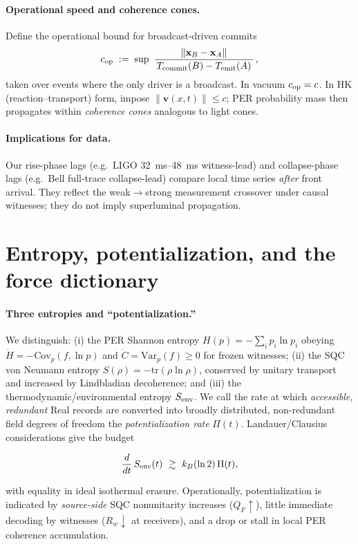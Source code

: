 \documentclass[11pt]{article}
\begin{document}
\paragraph{Operational speed and coherence cones.}
Define the operational bound for broadcast-driven commits
\begin{equation}
c_{\rm op}\;:=\;\sup\ \frac{\|\mathbf x_B-\mathbf x_A\|}{\,T_{\rm commit}(B)-T_{\rm emit}(A)\,}\,,
\end{equation}
taken over events where the only driver is a broadcast. In vacuum $c_{\rm op}=c$.
In HK (reaction--transport) form, impose $\|\mathbf v(x,t)\|\le c$; PER probability mass then propagates within \emph{coherence cones} analogous to light cones.

\paragraph{Implications for data.}
Our rise-phase lags (e.g.\ LIGO \SIrange{32}{48}{ms} witness-lead) and collapse-phase lags (e.g.\ Bell full-trace collapse-lead) compare local time series \emph{after} front arrival.
They reflect the weak$\to$strong measurement crossover under causal witnesses; they do not imply superluminal propagation.


\section{Entropy, potentialization, and the force dictionary}
\label{sec:entropy-forces}

\paragraph{Three entropies and ``potentialization.''}
We distinguish: (i) the PER Shannon entropy $H(p)=-\sum_i p_i\ln p_i$ obeying $\dot H=-\mathrm{Cov}_p(f,\ln p)$ and $\dot C=\mathrm{Var}_p(f)\!\ge 0$ for frozen witnesses; (ii) the SQC von Neumann entropy $S(\rho)=-\mathrm{tr}(\rho\ln\rho)$, conserved by unitary transport and increased by Lindbladian decoherence; and (iii) the thermodynamic/environmental entropy $S_{\rm env}$.
We call the rate at which \emph{accessible, redundant} Real records are converted into broadly distributed, non-redundant field degrees of freedom the \emph{potentialization rate} $\Pi(t)$.
Landauer/Clausius considerations give the budget
\begin{framed}\small
\begin{equation}
\frac{d}{dt}\,S_{\rm env}(t)\ \gtrsim\ k_B(\ln 2)\,\Pi(t),
\end{equation}
\end{framed}
with equality in ideal isothermal erasure.
Operationally, potentialization is indicated by \emph{source-side} SQC nonunitarity increases ($Q_F\uparrow$), little immediate decoding by witnesses ($R_w\downarrow$ at receivers), and a drop or stall in local PER coherence accumulation.
\end{document}
